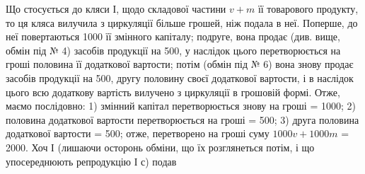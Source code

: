 Що стосується до кляси І, щодо складової частини $v + m$ її товарового
продукту, то ця кляса вилучила з циркуляції більше грошей, ніж подала
в неї. Поперше, до неї повертаються 1000 її змінного капіталу;
подруге, вона продає (див. вище, обмін під № 4) засобів продукції
на 500, у наслідок цього перетворюється на гроші половина
її додаткової вартости; потім (обмін під № 6) вона знову продає засобів
продукції на 500, другу половину своєї додаткової вартости,
і в наслідок цього всю додаткову вартість вилучено з циркуляції в грошовій
формі. Отже, маємо послідовно: 1) змінний капітал перетворюється
знову на гроші = 1000; 2) половина додаткової вартости перетворюється
на гроші = 500; 3) друга половина додаткової
вартости = 500; отже, перетворено на гроші суму
$1000 v + 1000 m$ = 2000. Хоч І (лишаючи осторонь обміни,
що їх розглянеться потім, і що упосереднюють репродукцію І $с$) подав
\parbreak{}  %
